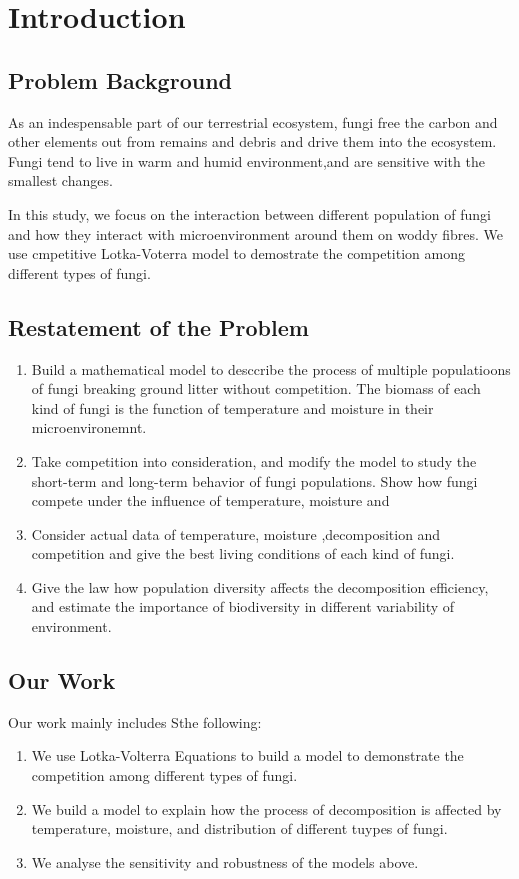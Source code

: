 \section{Introduction}
	\subsection{Problem Background}
	As an indespensable part of our terrestrial ecosystem, fungi free the carbon and other elements out from remains and debris and drive them into the ecosystem. Fungi tend to live in warm and humid environment,and are sensitive with the smallest changes.

	In this study, we focus on the interaction between different population of fungi and how they interact with microenvironment around them on woddy fibres. We use cmpetitive Lotka-Voterra model to demostrate the competition among different types of fungi.
	\subsection{Restatement of the Problem}
	\begin{enumerate}[\bfseries 1.]
	\item Build a mathematical model to desccribe the process of multiple populatioons of fungi breaking ground litter  without competition. The biomass of each kind of fungi is the function of temperature and moisture in their microenvironemnt.
	\item Take competition into consideration, and modify the model to study the short-term and long-term behavior of fungi populations. Show how fungi compete under the influence of temperature, moisture and 
	\item Consider actual data of temperature, moisture ,decomposition and competition and give the best living conditions of each kind of fungi.
	\item Give the law how population diversity affects the decomposition efficiency, and estimate the importance of biodiversity in different variability of environment.
	\end{enumerate}
	\subsection{Our Work}
	Our work mainly includes Sthe following:
	\begin{enumerate}[\bfseries 1.]
		\item We use Lotka-Volterra Equations to build a model to demonstrate the competition among different types of fungi.
		\item We build a model to explain how the process of decomposition is affected by temperature, moisture, and distribution of different tuypes of fungi.
		\item We analyse the sensitivity and robustness of the models above.
	\end{enumerate}
	